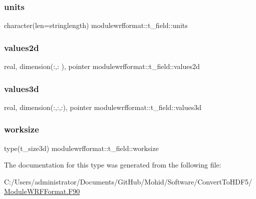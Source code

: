 \subsubsection{\texorpdfstring{units}{units}}
{\footnotesize\ttfamily character(len=stringlength) modulewrfformat\+::t\+\_\+field\+::units\hspace{0.3cm}{\ttfamily [private]}}

\mbox{\label{structmodulewrfformat_1_1t__field_ab03a26865884d4a01a14f7b7bd46d26a}} 
\subsubsection{\texorpdfstring{values2d}{values2d}}
{\footnotesize\ttfamily real, dimension(\+:,\+:  ), pointer modulewrfformat\+::t\+\_\+field\+::values2d\hspace{0.3cm}{\ttfamily [private]}}

\mbox{\label{structmodulewrfformat_1_1t__field_a9a933760c2baa9ec1801c1f78ddb33e1}} 
\subsubsection{\texorpdfstring{values3d}{values3d}}
{\footnotesize\ttfamily real, dimension(\+:,\+:,\+:), pointer modulewrfformat\+::t\+\_\+field\+::values3d\hspace{0.3cm}{\ttfamily [private]}}

\mbox{\label{structmodulewrfformat_1_1t__field_ac62fde7e2a6fe22fc472e9d521e59b67}} 
\subsubsection{\texorpdfstring{worksize}{worksize}}
{\footnotesize\ttfamily type(t\+\_\+size3d) modulewrfformat\+::t\+\_\+field\+::worksize\hspace{0.3cm}{\ttfamily [private]}}



The documentation for this type was generated from the following file\+:\begin{DoxyCompactItemize}
\item 
C\+:/\+Users/administrator/\+Documents/\+Git\+Hub/\+Mohid/\+Software/\+Convert\+To\+H\+D\+F5/\mbox{\hyperlink{_module_w_r_f_format_8_f90}{Module\+W\+R\+F\+Format.\+F90}}\end{DoxyCompactItemize}
